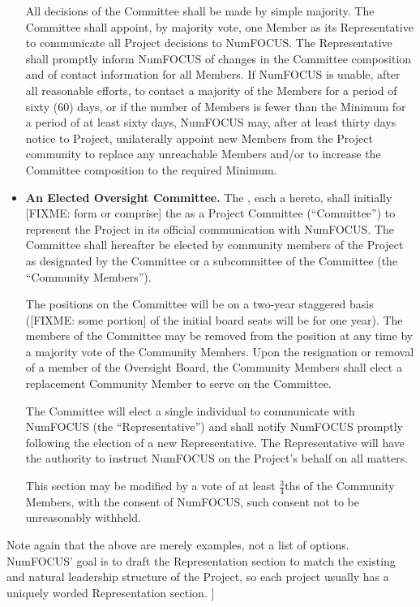 \begin{itemize}
All decisions of the Committee shall be made by simple majority. The Committee
shall appoint, by majority vote, one Member as its Representative to
communicate all Project decisions to NumFOCUS. The Representative shall
promptly inform NumFOCUS of changes in the Committee composition and of contact
information for all Members. If NumFOCUS is unable, after all reasonable
efforts, to contact a majority of the Members for a period of sixty (60) days,
or if the number of Members is fewer than the Minimum for a period of at least
sixty days, NumFOCUS may, after at least thirty days notice to Project,
unilaterally appoint new Members from the Project community to replace any
unreachable Members and/or to increase the Committee composition to the
required Minimum.

\item \textbf{An Elected Oversight Committee.} The \signatories{}, each a
  hereto, shall initially [FIXME: form or comprise] the \leadershipbody{} as a
  Project Committee (``Committee'') to represent the Project in its official
  communication with NumFOCUS.  The Committee shall hereafter be elected by
  community members of the Project as designated by the Committee or a
  subcommittee of the Committee (the ``Community Members'').

The positions on the Committee will be on a two-year staggered basis ([FIXME:
  some portion] of the initial board seats will be for one year).  The members
of the Committee may be removed from the position at any time by a majority
vote of the Community Members.  Upon the resignation or removal of a member of
the Oversight Board, the Community Members shall elect a replacement Community
Member to serve on the Committee.

The Committee will elect a single individual to communicate with NumFOCUS (the
``Representative'') and shall notify NumFOCUS promptly following the election
of a new Representative.  The Representative will have the authority to
instruct NumFOCUS on the Project's behalf on all matters.

This section may be modified by a vote of at least $\frac{3}{4}$ths of the
Community Members, with the consent of NumFOCUS, such consent not to be
unreasonably withheld.


\end{itemize}

Note again that the above are merely examples, not a list of options.
NumFOCUS' goal is to draft the Representation section to match the existing and
natural leadership structure of the Project, so each project usually has a
uniquely worded Representation section. ]

